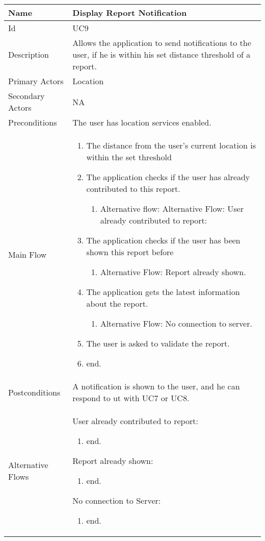 \begin{tabularx}{\textwidth}{|l|X|}
\hline
Name              & Display Report Notification \\ \hline 
Id                & UC9 \\ \hline
Description       & Allows the application to send notifications to the user, if he is within his set distance threshold of a report. \\ \hline
Primary Actors    & Location \\ \hline
Secondary Actors  & NA \\ \hline
Preconditions     & The user has location services enabled. \\ \hline
Main Flow         &
{\footnotesize \begin{enumerate}
\item The distance from the user’s current location is within the set threshold
\item The application checks if the user has already contributed to this report.
\begin{enumerate}
\item Alternative flow: Alternative Flow: User already contributed to report:
\end{enumerate}
\item The application checks if the user has been shown this report before
\begin{enumerate}
\item Alternative Flow: Report already shown.
\end{enumerate}
\item The application gets the latest information about the report.
\begin{enumerate}
\item Alternative Flow: No connection to server.
\end{enumerate}
\item The user is asked to validate the report.
\item end.
\end{enumerate}} \\ \hline
Postconditions    & A notification is shown to the user, and he can respond to ut with UC7 or UC8. \\ \hline
Alternative Flows & 
User already contributed to report:
{\footnotesize \begin{enumerate}
\item end.
\end{enumerate}}
Report already shown:
{\footnotesize \begin{enumerate}
\item end.
\end{enumerate}}
No connection to Server:
{\footnotesize \begin{enumerate}
\item end.
\end{enumerate}}
\\ \hline
\end{tabularx}